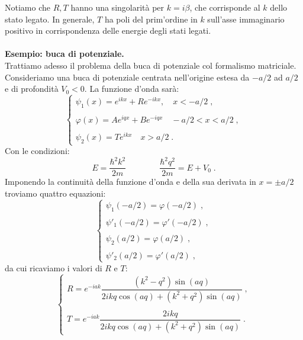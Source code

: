 \documentclass[12pt,a4paper]{report}
\theoremstyle{definition}
\numberwithin{equation}{section}
\begin{document}
Notiamo che $R,T$ hanno una singolarità per $k=i\beta$, che corrisponde al $k$ dello stato legato. In generale, $T$ ha poli del prim'ordine in $k$ sull'asse immaginario positivo in corrispondenza delle energie degli stati legati. \\
\\
\textbf{Esempio: buca di potenziale.} \\
Trattiamo adesso il problema della buca di potenziale col formalismo matriciale. Consideriamo una buca di potenziale centrata nell'origine estesa da $-a/2$ ad $a/2$ e di profondità $V_0<0$. La funzione d'onda sarà:
\begin{equation}
\begin{cases}
\psi_1(x)=e^{ikx}+Re^{-ikx}, \quad x<-a/2\;, \\
\\
\varphi(x)=Ae^{iqx}+Be^{-iqx} \quad -a/2<x<a/2\;, \\
\\
\psi_2(x)=Te^{ikx} \quad x>a/2\;.
\end{cases}
\end{equation}
Con le condizioni:
\begin{equation}
E=\frac{\hbar^2 k^2}{2m} \qquad \qquad \frac{\hbar^2 q^2}{2m}=E+V_0\;.
\end{equation}
Imponendo la continuità della funzione d'onda e della sua derivata in $x=\pm a/2$ troviamo quattro equazioni:
$$
\begin{cases}
\psi_1(-a/2)=\varphi(-a/2)\;, \\
\\
\psi'_1(-a/2)=\varphi'(-a/2)\;, \\
\\
\psi_2(a/2)=\varphi(a/2)\;, \\
\\
\psi'_2(a/2)=\varphi'(a/2)\;,
\end{cases}
$$
da cui ricaviamo i valori di $R$ e $T$:
\begin{equation}
\begin{cases}
R=e^{-iak}\dfrac{(k^2-q^2)\sin(aq)}{2ikq\cos(aq)+(k^2+q^2)\sin(aq)}\;, \\
\\
T=e^{-iak}\dfrac{2ikq}{2ikq\cos(aq)+(k^2+q^2)\sin(aq)}\;.
\end{cases}
\end{equation}
\end{document}
